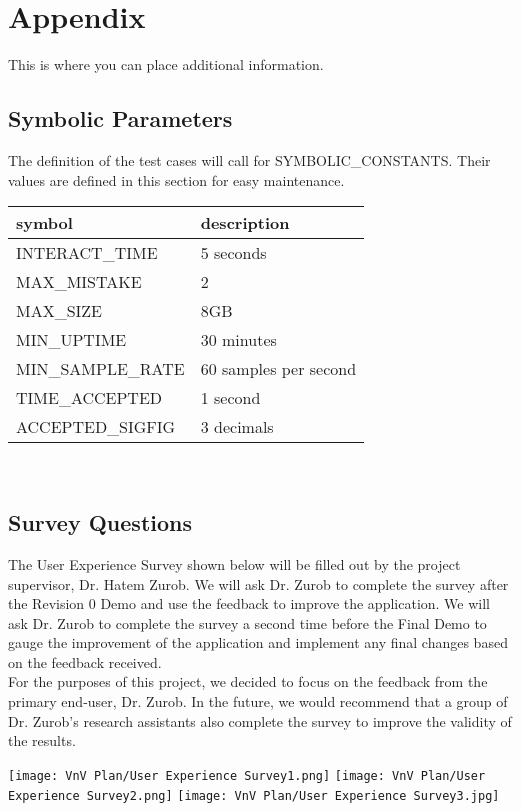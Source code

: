 \documentclass[12pt, titlepage]{article}
\begin{document}
				




\newpage

\section{Appendix}
\label{Apx}

This is where you can place additional information.

\subsection{Symbolic Parameters}

The definition of the test cases will call for SYMBOLIC\_CONSTANTS.
Their values are defined in this section for easy maintenance.

\begin{tabular}{l l} 
  \toprule		
  \textbf{symbol} & \textbf{description}\\
  \midrule 
  INTERACT\_TIME & 5 seconds \\
  MAX\_MISTAKE & 2 \\
  MAX\_SIZE & 8GB \\ 
  MIN\_UPTIME & 30 minutes \\ 
  MIN\_SAMPLE\_RATE & 60 samples per second\\
  TIME\_ACCEPTED & 1 second \\
  ACCEPTED\_SIGFIG & 3 decimals \\
  \bottomrule
\end{tabular}\\

\subsection{Survey Questions}
\label{SQ}
\noindent The User Experience Survey shown below will be filled out by the project supervisor, Dr. Hatem Zurob. We will ask Dr. Zurob to complete the survey after the Revision 0 Demo and use the feedback to improve the application. We will ask Dr. Zurob to complete the survey a second time before the Final Demo to gauge the improvement of the application and implement any final changes based on the feedback received. \\

\noindent For the purposes of this project, we decided to focus on the feedback from the primary end-user, Dr. Zurob. In the future, we would recommend that a group of Dr. Zurob's research assistants also complete the survey to improve the validity of the results. 

\label{Svy}
\texttt{[image: VnV Plan/User Experience Survey1.png]}
  \texttt{[image: VnV Plan/User Experience Survey2.png]}
 \texttt{[image: VnV Plan/User Experience Survey3.jpg]}
\end{document}
